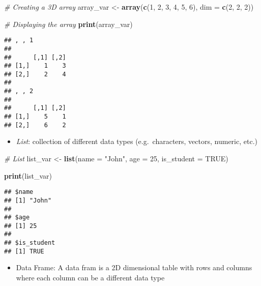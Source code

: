 \documentclass[
]{article}
\newenvironment{Shaded}{\begin{snugshade}}{\end{snugshade}}
\newcommand{\AttributeTok}[1]{\textcolor[rgb]{0.13,0.29,0.53}{#1}}
\newcommand{\CommentTok}[1]{\textcolor[rgb]{0.56,0.35,0.01}{\textit{#1}}}
\newcommand{\ConstantTok}[1]{\textcolor[rgb]{0.56,0.35,0.01}{#1}}
\newcommand{\DecValTok}[1]{\textcolor[rgb]{0.00,0.00,0.81}{#1}}
\newcommand{\FunctionTok}[1]{\textcolor[rgb]{0.13,0.29,0.53}{\textbf{#1}}}
\newcommand{\NormalTok}[1]{#1}
\newcommand{\OtherTok}[1]{\textcolor[rgb]{0.56,0.35,0.01}{#1}}
\newcommand{\StringTok}[1]{\textcolor[rgb]{0.31,0.60,0.02}{#1}}
\providecommand{\tightlist}{%
  \setlength{\itemsep}{0pt}\setlength{\parskip}{0pt}}
\begin{document}
\begin{enumerate}
\begin{Shaded}
\begin{Highlighting}[]
\CommentTok{\# Creating a 3D array }
\NormalTok{array\_var }\OtherTok{\textless{}{-}} \FunctionTok{array}\NormalTok{(}\FunctionTok{c}\NormalTok{(}\DecValTok{1}\NormalTok{, }\DecValTok{2}\NormalTok{, }\DecValTok{3}\NormalTok{, }\DecValTok{4}\NormalTok{, }\DecValTok{5}\NormalTok{, }\DecValTok{6}\NormalTok{), }\AttributeTok{dim =} \FunctionTok{c}\NormalTok{(}\DecValTok{2}\NormalTok{, }\DecValTok{2}\NormalTok{, }\DecValTok{2}\NormalTok{))}

\CommentTok{\# Displaying the array}
\FunctionTok{print}\NormalTok{(array\_var)}
\end{Highlighting}
\end{Shaded}

\begin{verbatim}
## , , 1
## 
##      [,1] [,2]
## [1,]    1    3
## [2,]    2    4
## 
## , , 2
## 
##      [,1] [,2]
## [1,]    5    1
## [2,]    6    2
\end{verbatim}

  \begin{itemize}
  \tightlist
  \item
    \emph{List}: collection of different data types (e.g.~characters,
    vectors, numeric, etc.)
  \end{itemize}

\begin{Shaded}
\begin{Highlighting}[]
\CommentTok{\# List}
\NormalTok{list\_var }\OtherTok{\textless{}{-}} \FunctionTok{list}\NormalTok{(}\AttributeTok{name =} \StringTok{"John"}\NormalTok{, }\AttributeTok{age =} \DecValTok{25}\NormalTok{, }\AttributeTok{is\_student =} \ConstantTok{TRUE}\NormalTok{)}

\FunctionTok{print}\NormalTok{(list\_var)}
\end{Highlighting}
\end{Shaded}

\begin{verbatim}
## $name
## [1] "John"
## 
## $age
## [1] 25
## 
## $is_student
## [1] TRUE
\end{verbatim}

  \begin{itemize}
  \tightlist
  \item
    Data Frame: A data fram is a 2D dimensional table with rows and
    columns where each column can be a different data type
  \end{itemize}


\end{enumerate}
\end{document}
